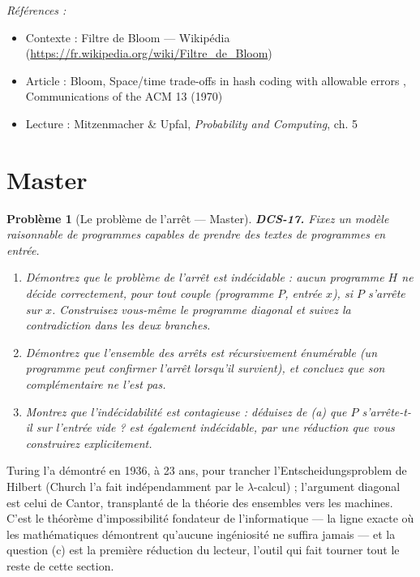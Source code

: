 \documentclass[11pt]{article}
\newtheorem{problem}{Problème}
\newenvironment{refs}{\par\small\noindent\emph{Références :}\begin{itemize}\setlength\itemsep{0pt}}{\end{itemize}\normalsize}
\begin{document}
\begin{refs}
\item Contexte : Filtre de Bloom --- Wikipédia (\url{https://fr.wikipedia.org/wiki/Filtre_de_Bloom})
\item Article : Bloom, \og{} Space/time trade-offs in hash coding with allowable errors \fg{}, Communications of the ACM 13 (1970)
\item Lecture : Mitzenmacher \& Upfal, \textit{Probability and Computing}, ch. 5
\end{refs}

\bigskip


\section*{Master}

\begin{problem}[{Le problème de l'arrêt --- Master}]
\textbf{DCS-17.} Fixez un modèle raisonnable de programmes capables de prendre des textes de programmes en entrée.
\begin{enumerate}
\item[(a)] Démontrez que le problème de l'arrêt est indécidable : aucun programme $H$ ne décide correctement, pour tout couple (programme $P$, entrée $x$), si $P$ s'arrête sur $x$. Construisez vous-même le programme diagonal et suivez la contradiction dans les deux branches.
\item[(b)] Démontrez que l'ensemble des arrêts est récursivement énumérable (un programme peut confirmer l'arrêt lorsqu'il survient), et concluez que son complémentaire ne l'est pas.
\item[(c)] Montrez que l'indécidabilité est contagieuse : déduisez de (a) que \og{} $P$ s'arrête-t-il sur l'entrée vide ? \fg{} est également indécidable, par une réduction que vous construirez explicitement.
\end{enumerate}

\end{problem}

\noindent Turing l'a démontré en 1936, à 23 ans, pour trancher l'Entscheidungsproblem de Hilbert (Church l'a fait indépendamment par le $\lambda$-calcul) ; l'argument diagonal est celui de Cantor, transplanté de la théorie des ensembles vers les machines. C'est le théorème d'impossibilité fondateur de l'informatique --- la ligne exacte où les mathématiques démontrent qu'aucune ingéniosité ne suffira jamais --- et la question (c) est la première réduction du lecteur, l'outil qui fait tourner tout le reste de cette section.
\end{document}
